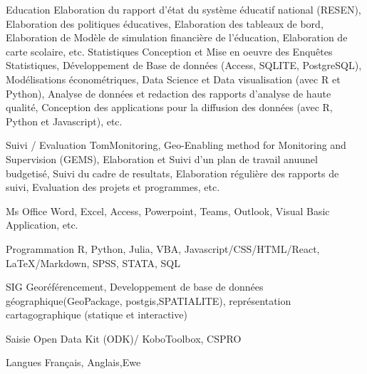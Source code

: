 

\begin{cvskills}
   \cvskill
{Education} %
    {Elaboration du rapport d'état du système éducatif national (RESEN), Elaboration des politiques éducatives, Elaboration des tableaux de bord, Elaboration de Modèle de simulation financière de l'éducation, Elaboration de carte scolaire, etc.} %
  \cvskill
    {Statistiques} %
    { Conception et Mise en oeuvre des Enquêtes Statistiques, Développement de Base de données (Access, SQLITE, PostgreSQL), Modélisations économétriques, Data Science et Data visualisation (avec R et Python), Analyse de données et redaction des rapports d'analyse de haute qualité, Conception des applications pour la diffusion des données (avec R, Python et Javascript), etc. } %
    
  \cvskill
    {Suivi / Evaluation} %
    {TomMonitoring, Geo-Enabling method for Monitoring and Supervision (GEMS), Elaboration et Suivi  d'un plan de travail anuunel budgetisé, Suivi du cadre de resultats, Elaboration régulière des rapports de suivi, Evaluation des projets et programmes, etc.} %


  \cvskill
    {Ms Office} %
    {Word, Excel, Access, Powerpoint, Teams, Outlook, Visual Basic Application, etc.} %

  \cvskill
    {Programmation} %
    {R, Python, Julia, VBA, Javascript/CSS/HTML/React, LaTeX/Markdown, SPSS, STATA, SQL} %

  \cvskill
    {SIG} %
    {Georéférencement, Developpement de base de données géographique(GeoPackage, postgis,SPATIALITE), représentation cartagographique (statique et interactive)} %

  \cvskill
    {Saisie} %
    {Open Data Kit (ODK)/ KoboToolbox, CSPRO} %

  \cvskill
    {Langues} %
    {Français, Anglais,Ewe} %

\end{cvskills}

